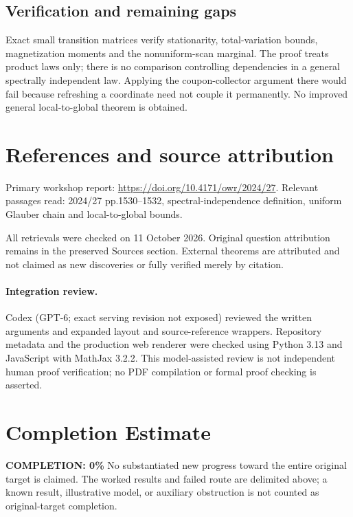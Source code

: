 \documentclass[11pt]{article}
\begin{document}
\subsection{Verification and remaining gaps}
Exact small transition matrices verify stationarity, total-variation bounds, magnetization moments and the nonuniform-scan marginal. The proof treats product laws only; there is no comparison controlling dependencies in a general spectrally independent law. Applying the coupon-collector argument there would fail because refreshing a coordinate need not couple it permanently. No improved general local-to-global theorem is obtained.

\section{References and source attribution}
Primary workshop report: \url{https://doi.org/10.4171/owr/2024/27}. Relevant passages read: 2024/27 pp.1530--1532, spectral-independence definition, uniform Glauber chain and local-to-global bounds.

All retrievals were checked on 11 October 2026. Original question attribution remains in the preserved Sources section. External theorems are attributed and not claimed as new discoveries or fully verified merely by citation.


\paragraph{Integration review.} Codex (GPT-6; exact serving revision not exposed) reviewed the written arguments and expanded layout and source-reference wrappers. Repository metadata and the production web renderer were checked using Python 3.13 and JavaScript with MathJax 3.2.2. This model-assisted review is not independent human proof verification; no PDF compilation or formal proof checking is asserted.

\section{Completion Estimate}
\noindent\textbf{COMPLETION: 0\%}
No substantiated new progress toward the entire original target is claimed. The worked results and failed route are delimited above; a known result, illustrative model, or auxiliary obstruction is not counted as original-target completion.
\end{document}
